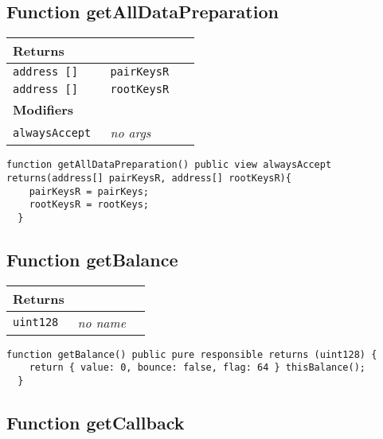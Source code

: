 \subsection{Function getAllDataPreparation}


\ifsoltables
\noindent\begin{tabular}{|l|l|p{5cm}|}\hline
\multicolumn{3}{|l|}{\bf Returns}\\\hline
\tt address [] & \tt pairKeysR &\\\hline
\tt address [] & \tt rootKeysR &\\\hline
\multicolumn{3}{|l|}{\bf Modifiers}\\\hline
\tt alwaysAccept & {\em no args} &\\\hline
\end{tabular}
\fi



\begin{lstlisting}[firstnumber=215]
  function getAllDataPreparation() public view alwaysAccept returns(address[] pairKeysR, address[] rootKeysR){
    pairKeysR = pairKeys;
    rootKeysR = rootKeys;
  }
\end{lstlisting}

\subsection{Function getBalance}


\ifsoltables
\noindent\begin{tabular}{|l|l|p{5cm}|}\hline
\multicolumn{3}{|l|}{\bf Returns}\\\hline
\tt uint128 & {\em no name} &\\\hline
\end{tabular}
\fi



\begin{lstlisting}[firstnumber=351]
  function getBalance() public pure responsible returns (uint128) {
    return { value: 0, bounce: false, flag: 64 } thisBalance();
  }
\end{lstlisting}

\subsection{Function getCallback}


